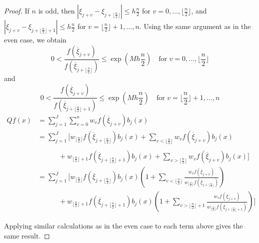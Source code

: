 \documentclass[10pt,a4paper]{amsart}
\newcommand{\floorn}{\lfloor \frac{n}{2}\rfloor}
\newcommand{\fracn}{\frac{n}{2}}
\begin{document}
\begin{proof}
If $n$ is odd, then $|\xi_{j+v}-\xi_{j+\lfloor\fracn\rfloor}|\leq h\fracn$ for $v=0,\dots,\lfloor\fracn\rfloor$, and $|\xi_{j+v}-\xi_{j+\lfloor\fracn\rfloor+1}|\leq h\fracn$ for $v=\lfloor\fracn\rfloor+1,\dots,n$. Using the same argument as in the even case, we obtain
$$0<\dfrac{f(\overline\xi_{j+v})}{f(\overline\xi_{j+\lfloor\fracn\rfloor})}\leq \exp(Mh\fracn)\quad\text{for $v=0,\dots,\lfloor\fracn\rfloor$}$$
and 
$$0<\dfrac{f(\overline\xi_{j+v})}{f(\overline\xi_{j+\lfloor\fracn\rfloor+1})}\leq \exp(Mh\fracn)\quad\text{for $v=\lfloor\fracn\rfloor+1,\dots,n$}$$
\begin{align*}
    Qf(x)&=\sum_{j=1}^J\sum_{v=0}^nw_vf(\overline\xi_{j+v})b_j(x)\\
    &=\sum_{j=1}^J\bigg[w_{\floorn}f(\overline\xi_{j+\floorn})b_j(x)+\sum_{v<\floorn}w_vf(\overline\xi_{j+v})b_j(x)\\
    \\&\quad\quad\quad+w_{\floorn+1}f(\overline\xi_{j+\floorn+1})b_j(x)+\sum_{v>\floorn}w_vf(\overline\xi_{j+v})b_j(x)\bigg]\\
    &=\sum_{j=1}^J\bigg[w_{\floorn}f(\overline\xi_{j+\floorn})b_j(x)\left(1+\sum_{v<\floorn}\frac{w_vf(\overline\xi_{j+v})}{w_{\floorn} f(\overline\xi_{j+\floorn})}\right)\\
    &\quad\quad\quad+w_{\floorn+1}f(\overline\xi_{j+\floorn+1})b_j(x)\left(1+\sum_{v>\floorn+1}\frac{w_vf(\overline\xi_{j+v})}{w_{\floorn} f(\overline\xi_{j+\floorn+1})}\right)\bigg]
\end{align*}

Applying similar calculations as in the even case to each term above gives the same result.
\end{proof}
\end{document}
